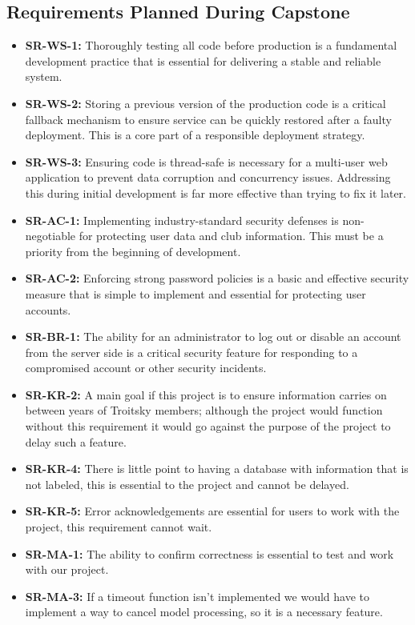 \documentclass{article}
\begin{document}
\subsection{Requirements Planned During Capstone}
\begin{itemize}
    \item \textbf{SR-WS-1:} Thoroughly testing all code before production is a fundamental development practice that is essential for delivering a stable and reliable system.
    \item \textbf{SR-WS-2:} Storing a previous version of the production code is a critical fallback mechanism to ensure service can be quickly restored after a faulty deployment. This is a core part of a responsible deployment strategy.
    \item \textbf{SR-WS-3:} Ensuring code is thread-safe is necessary for a multi-user web application to prevent data corruption and concurrency issues. Addressing this during initial development is far more effective than trying to fix it later.
    \item \textbf{SR-AC-1:} Implementing industry-standard security defenses is non-negotiable for protecting user data and club information. This must be a priority from the beginning of development.
    \item \textbf{SR-AC-2:} Enforcing strong password policies is a basic and effective security measure that is simple to implement and essential for protecting user accounts.
    \item \textbf{SR-BR-1:} The ability for an administrator to log out or disable an account from the server side is a critical security feature for responding to a compromised account or other security incidents.
    \item \textbf{SR-KR-2:} A main goal if this project is to ensure information carries on between years of Troitsky members; although the project would function without this requirement it would go against the purpose of the project to delay such a feature.
    \item \textbf{SR-KR-4:} There is little point to having a database with information that is not labeled, this is essential to the project and cannot be delayed.
    \item \textbf{SR-KR-5:} Error acknowledgements are essential for users to work with the project, this requirement cannot wait.
    \item \textbf{SR-MA-1:} The ability to confirm correctness is essential to test and work with our project.
    \item \textbf{SR-MA-3:} If a timeout function isn't implemented we would have to implement a way to cancel model processing, so it is a necessary feature.

\end{itemize}
\end{document}
